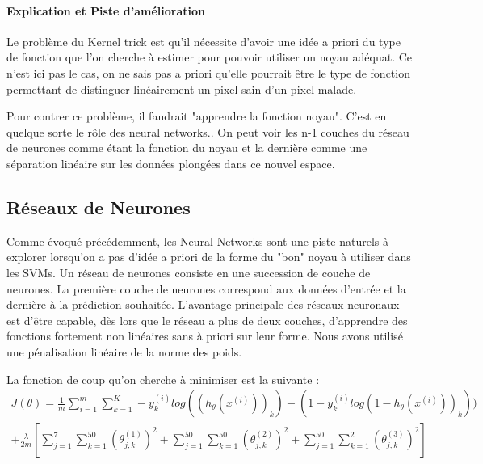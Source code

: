 \documentclass[a4paper,10pt]{report}
\begin{document}
\paragraph{Explication et Piste d'amélioration}
Le problème du Kernel trick est qu'il nécessite d'avoir une idée a priori du type de fonction que l'on cherche à estimer pour pouvoir utiliser un noyau adéquat. Ce n'est ici pas le cas, on ne sais pas a priori qu'elle pourrait être le type de fonction permettant de distinguer linéairement un pixel sain d'un pixel malade.

Pour contrer ce problème, il faudrait "apprendre la fonction noyau". C'est en quelque sorte le rôle des neural networks.. On peut voir les n-1 couches du réseau de neurones comme étant la fonction du noyau et la dernière comme une séparation linéaire sur les données plongées dans ce nouvel espace.

\subsection{Réseaux de Neurones}

Comme évoqué précédemment, les Neural Networks sont une piste naturels à explorer lorsqu'on a pas d'idée a priori de la forme du "bon" noyau à utiliser dans les SVMs. Un réseau de neurones consiste en une succession de couche de neurones. La première couche de neurones correspond aux données d'entrée et la dernière à la prédiction souhaitée. L'avantage principale des réseaux neuronaux est d'être capable, dès lors que le réseau a plus de deux couches, d'apprendre des fonctions fortement non linéaires sans à priori sur leur forme. Nous avons utilisé une pénalisation linéaire de la norme des poids. 

La fonction de coup qu'on cherche à minimiser est la suivante :
\begin{equation}
\begin{split} 
J(\theta)= \frac{1}{m} \sum_{i=1}^m \sum_{k=1}^K -y_k^{(i)} log((h_{\theta}(x^{(i)}))_k) - (1 - y_k^{(i)}log(1 - h_{\theta}(x^{(i)}))_k))\\
 + \frac{\lambda}{2m}[\sum_{j=1}^7\sum_{k=1}^{50}(\theta_{j,k}^{(1)})^2 + \sum_{j=1}^{50}\sum_{k=1}^{50}(\theta_{j,k}^{(2)})^2 + \sum_{j=1}^{50}\sum_{k=1}^2(\theta_{j,k}^{(3)})^2]
\end{split}
\end{equation} 
\end{document}
